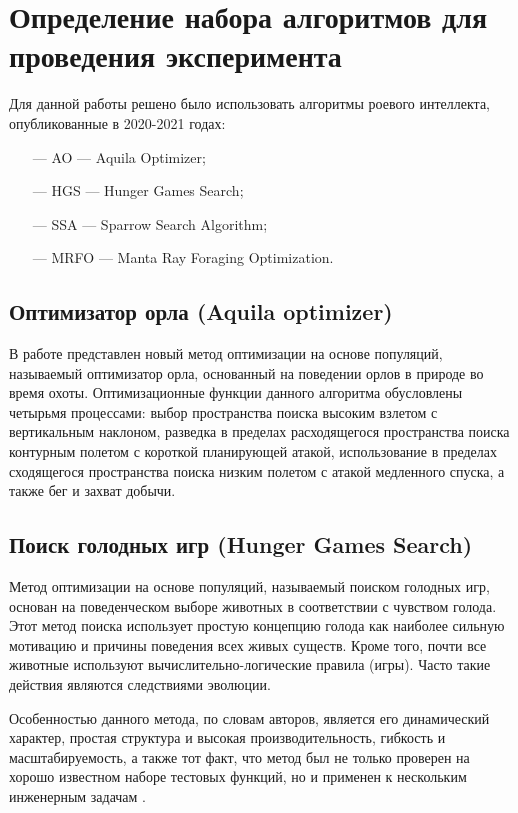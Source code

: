 \section{Определение набора алгоритмов для проведения эксперимента}\label{BIOAlgs}

Для данной работы решено было использовать алгоритмы роевого интеллекта, опубликованные в 2020-2021 годах:

\begin{itemize}
    \item[—] AO — Aquila Optimizer;
    \item[—] HGS — Hunger Games Search;
    \item[—] SSA — Sparrow Search Algorithm;
    \item[—] MRFO — Manta Ray Foraging Optimization.
\end{itemize}

\subsection{Оптимизатор орла (Aquila optimizer)}\label{AO}

В работе \cite{AO} представлен новый метод оптимизации на основе популяций, называемый оптимизатор орла,
основанный на поведении орлов в природе во время охоты. Оптимизационные функции
данного алгоритма обусловлены четырьмя процессами: выбор пространства поиска высоким
взлетом с вертикальным наклоном, разведка в пределах расходящегося пространства поиска
контурным полетом с короткой планирующей атакой, использование в пределах сходящегося пространства
поиска низким полетом с атакой медленного спуска, а также бег и захват добычи.

\subsection{Поиск голодных игр (Hunger Games Search)}\label{HGS}

Метод оптимизации на основе популяций, называемый поиском голодных игр, основан на поведенческом выборе
животных в соответствии с чувством голода. Этот метод поиска использует простую концепцию голода как наиболее
сильную мотивацию и причины поведения всех живых существ. Кроме того, почти все животные используют 
вычислительно-лог\-ические правила (игры). Часто такие действия являются следствиями эволюции.

Особенностью данного метода, по словам авторов, является его динамический характер, простая структура и
высокая производительность, гибкость и масштабируемость, а также тот факт, что метод был не только
проверен на хорошо известном наборе тестовых функций, но и применен к нескольким инженерным задачам \cite{HGS}.


